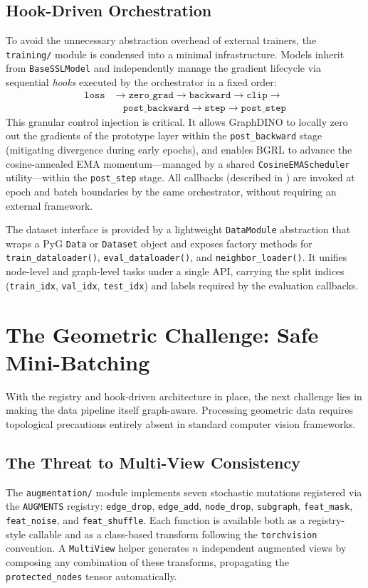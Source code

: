 \documentclass[conference]{IEEEtran}
\begin{document}
\subsection{Hook-Driven Orchestration}
To avoid the unnecessary abstraction overhead of external trainers, the \texttt{training/} module is condensed into a minimal infrastructure. Models inherit from \texttt{BaseSSLModel} and independently manage the gradient lifecycle via sequential \textit{hooks} executed by the orchestrator in a fixed order:
\begin{equation}
\begin{split}
\texttt{loss} &\rightarrow \texttt{zero\_grad} \rightarrow \texttt{backward} \rightarrow \texttt{clip} \rightarrow \\
&\quad \texttt{post\_backward} \rightarrow \texttt{step} \rightarrow \texttt{post\_step}
\end{split}
\end{equation}
This granular control injection is critical. It allows GraphDINO to locally zero out the gradients of the prototype layer within the \texttt{post\_backward} stage (mitigating divergence during early epochs), and enables BGRL to advance the cosine-annealed EMA momentum---managed by a shared \texttt{CosineEMAScheduler} utility---within the \texttt{post\_step} stage. All callbacks (described in ) are invoked at epoch and batch boundaries by the same orchestrator, without requiring an external framework.

The dataset interface is provided by a lightweight \texttt{DataModule} abstraction that wraps a PyG \texttt{Data} or \texttt{Dataset} object and exposes factory methods for \texttt{train\_dataloader()}, \texttt{eval\_dataloader()}, and \texttt{neighbor\_loader()}. It unifies node-level and graph-level tasks under a single API, carrying the split indices (\texttt{train\_idx}, \texttt{val\_idx}, \texttt{test\_idx}) and labels required by the evaluation callbacks.

\section{The Geometric Challenge: Safe Mini-Batching}
With the registry and hook-driven architecture in place, the next challenge lies in making the data pipeline itself graph-aware. Processing geometric data requires topological precautions entirely absent in standard computer vision frameworks.

\subsection{The Threat to Multi-View Consistency}
The \texttt{augmentation/} module implements seven stochastic mutations registered via the \texttt{AUGMENTS} registry: \texttt{edge\_drop}, \texttt{edge\_add}, \texttt{node\_drop}, \texttt{subgraph}, \texttt{feat\_mask}, \texttt{feat\_noise}, and \texttt{feat\_shuffle}. Each function is available both as a registry-style callable and as a class-based transform following the \texttt{torchvision} convention. A \texttt{MultiView} helper generates $n$ independent augmented views by composing any combination of these transforms, propagating the \texttt{protected\_nodes} tensor automatically.
\end{document}
